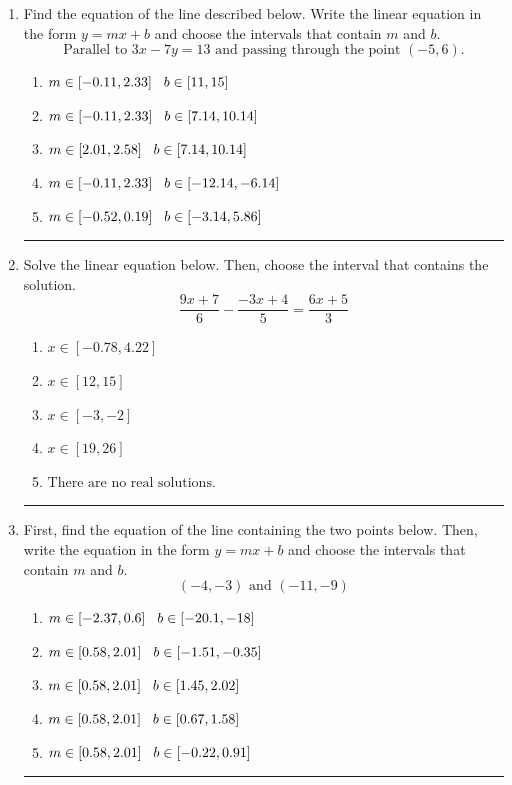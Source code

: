 \documentclass[14pt]{extbook}
\newcommand{\litem}[1]{\item#1\hspace*{-1cm}\rule{\textwidth}{0.4pt}}
\begin{document}
\begin{enumerate}
{\begin{enumerate}[label=\Alph*.]
\end{enumerate} }
\litem{
Find the equation of the line described below. Write the linear equation in the form $ y=mx+b $ and choose the intervals that contain $m$ and $b$.\[ \text{Parallel to } 3 x - 7 y = 13 \text{ and passing through the point } (-5, 6). \]\begin{enumerate}[label=\Alph*.]
\item \( m \in [-0.11, 2.33] \hspace*{3mm} b \in [11, 15] \)
\item \( m \in [-0.11, 2.33] \hspace*{3mm} b \in [7.14, 10.14] \)
\item \( m \in [2.01, 2.58] \hspace*{3mm} b \in [7.14, 10.14] \)
\item \( m \in [-0.11, 2.33] \hspace*{3mm} b \in [-12.14, -6.14] \)
\item \( m \in [-0.52, 0.19] \hspace*{3mm} b \in [-3.14, 5.86] \)

\end{enumerate} }
\litem{
Solve the linear equation below. Then, choose the interval that contains the solution.\[ \frac{9x + 7}{6} - \frac{-3x + 4}{5} = \frac{6x + 5}{3} \]\begin{enumerate}[label=\Alph*.]
\item \( x \in [-0.78, 4.22] \)
\item \( x \in [12, 15] \)
\item \( x \in [-3, -2] \)
\item \( x \in [19, 26] \)
\item \( \text{There are no real solutions.} \)

\end{enumerate} }
\litem{
First, find the equation of the line containing the two points below. Then, write the equation in the form $ y=mx+b $ and choose the intervals that contain $m$ and $b$.\[ (-4, -3) \text{ and } (-11, -9) \]\begin{enumerate}[label=\Alph*.]
\item \( m \in [-2.37, 0.6] \hspace*{3mm} b \in [-20.1, -18] \)
\item \( m \in [0.58, 2.01] \hspace*{3mm} b \in [-1.51, -0.35] \)
\item \( m \in [0.58, 2.01] \hspace*{3mm} b \in [1.45, 2.02] \)
\item \( m \in [0.58, 2.01] \hspace*{3mm} b \in [0.67, 1.58] \)
\item \( m \in [0.58, 2.01] \hspace*{3mm} b \in [-0.22, 0.91] \)


\end{enumerate}}
\end{enumerate}
\end{document}
